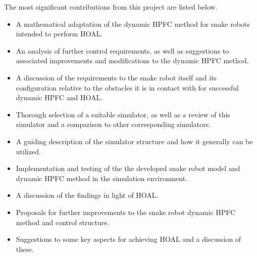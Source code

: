 The most significant contributions from this project are listed below.

\begin{itemize}
    \item A mathematical adaptation of the dynamic HPFC method for snake robots intended to perform HOAL.
    \item An analysis of further control requirements, as well as suggestions to associated improvements and modifications to the dynamic HPFC method.
    \item A discussion of the requirements to the snake robot itself and its configuration relative to the obstacles it is in contact with for successful dynamic HPFC and HOAL.
    \item Thorough selection of a suitable simulator, as well as a review of this simulator and a comparison to other corresponding simulators.
    \item A guiding description of the simulator structure and how it generally can be utilized.
    \item Implementation and testing of the the developed snake robot model and dynamic HPFC method in the simulation environment.
    \item A discussion of the findings in light of HOAL.
    \item Proposals for further improvements to the snake robot dynamic HPFC method and control structure.
    \item Suggestions to some key aspects for achieving HOAL and a discussion of these.
\end{itemize}




